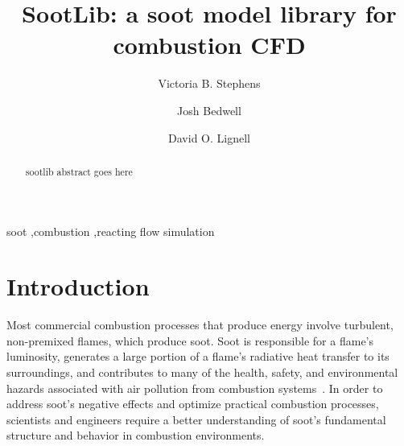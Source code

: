 \documentclass[preprint,12pt,letterpaper]{elsarticle}
\begin{document}
\begin{frontmatter}



\title{SootLib: a soot model library for combustion CFD}


\author{Victoria B. Stephens}
\author{Josh Bedwell}
\author{David O. Lignell}


\address{Chemical Engineering Department, Brigham Young University, Provo, UT 84602, USA}

\begin{abstract}
sootlib abstract goes here
\end{abstract}

\begin{keyword}
soot \sep combustion \sep reacting flow simulation
\end{keyword}

\end{frontmatter}

\linenumbers



\section{Introduction}
\label{s:intro}

Most commercial combustion processes that produce energy involve turbulent, non-premixed flames, which produce soot. Soot is responsible for a flame's luminosity, generates a large portion of a flame's radiative heat transfer to its surroundings, and contributes to many of the health, safety, and environmental hazards associated with air pollution from combustion systems~\cite{EPA_2009,EPA_2004}. In order to address soot's negative effects and optimize practical combustion processes, scientists and engineers require a better understanding of soot's fundamental structure and behavior in combustion environments.
\end{document}
